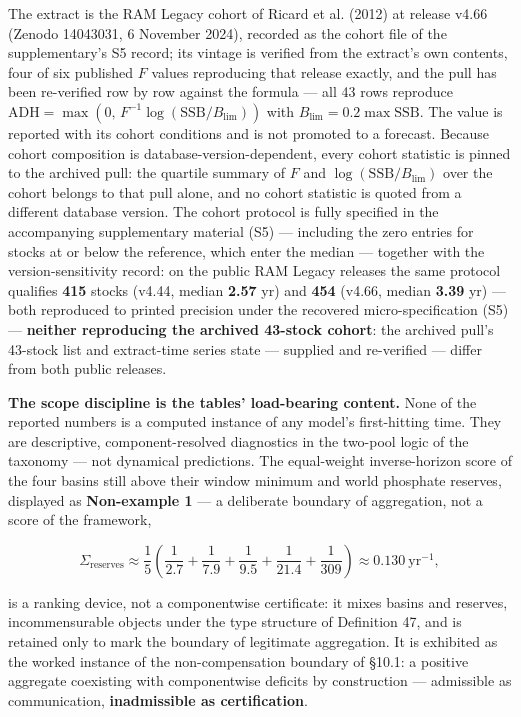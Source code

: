 \documentclass[11pt]{article}
\begin{document}
The extract is the RAM Legacy cohort of Ricard et al. (2012) at release v4.66 (Zenodo 14043031, 6 November 2024), recorded as the cohort file of the supplementary's S5 record; its vintage is verified from the extract's own contents, four of six published \(F\) values reproducing that release exactly, and the pull has been re-verified row by row against the formula --- all 43 rows reproduce \(\mathrm{ADH} =\allowbreak{} \max(0,\allowbreak{}\,\allowbreak{} F^{-1}\log(\mathrm{SSB}/B_{\lim}))\) with \(B_{\lim} =\allowbreak{} 0.2 \max \mathrm{SSB}\). The value is reported with its cohort conditions and is not promoted to a forecast. Because cohort composition is database-version-dependent, every cohort statistic is pinned to the archived pull: the quartile summary of \(F\) and \(\log(\mathrm{SSB}/B_{\lim})\) over the cohort belongs to that pull alone, and no cohort statistic is quoted from a different database version. The cohort protocol is fully specified in the accompanying supplementary material (S5) --- including the zero entries for stocks at or below the reference, which enter the median --- together with the version-sensitivity record: on the public RAM Legacy releases the same protocol qualifies \textbf{415} stocks (v4.44, median \textbf{2.57} yr) and \textbf{454} (v4.66, median \textbf{3.39} yr) --- both reproduced to printed precision under the recovered micro-specification (S5) --- \textbf{neither reproducing the archived 43-stock cohort}: the archived pull's 43-stock list and extract-time series state --- supplied and re-verified --- differ from both public releases.

\textbf{The scope discipline is the tables' load-bearing content.} None of the reported numbers is a computed instance of any model's first-hitting time. They are descriptive, component-resolved diagnostics in the two-pool logic of the taxonomy --- not dynamical predictions. The equal-weight inverse-horizon score of the four basins still above their window minimum and world phosphate reserves, displayed as \textbf{Non-example 1} --- a deliberate boundary of aggregation, not a score of the framework, 

$$\Sigma_{\mathrm{reserves}} \approx \frac{1}{5}\left( \frac{1}{2.7} + \frac{1}{7.9} + \frac{1}{9.5} + \frac{1}{21.4} + \frac{1}{309} \right) \approx 0.130\ \mathrm{yr}^{-1},$$

 is a ranking device, not a componentwise certificate: it mixes basins and reserves, incommensurable objects under the type structure of Definition 47, and is retained only to mark the boundary of legitimate aggregation. It is exhibited as the worked instance of the non-compensation boundary of \S10.1: a positive aggregate coexisting with componentwise deficits by construction --- admissible as communication, \textbf{inadmissible as certification}.
\end{document}
